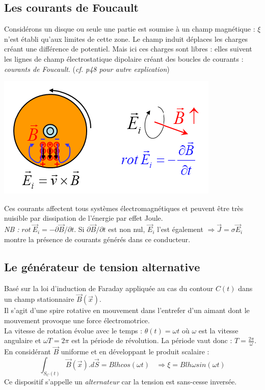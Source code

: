 \documentclass	[11pt, a4paper, openany]{book}
\begin{document}
\subsection{Les courants de Foucault}
Considérons un disque ou seule une partie est soumise à un champ magnétique : $\xi$ n'est établi qu'aux limites de cette zone. Le champ induit déplaces les charges créant une différence de potentiel. Mais ici ces charges sont libres : elles suivent les lignes de champ électrostatique dipolaire créant des boucles de courants : \textit{courants de Foucault}. (\textit{cf. p48 pour autre explication})
\begin{center}
	\includegraphics[scale=0.45]{em/image19.png}\\
\end{center}
Ces courants affectent tous systèmes électromagnétiques et peuvent être très nuisible par dissipation de l'énergie par effet Joule. \\
\textit{NB :} $rot\ \vec{E}_i = -\partial\vec{B}/\partial t$. Si $\partial\vec{B}/\partial t$ est non nul, $\vec{E}_i$ l'est également $\Rightarrow \vec{J} = \sigma\vec{E}_i$ montre la présence de courants générés dans ce conducteur.

\subsection{Le générateur de tension alternative}
Basé sur la loi d'induction de Faraday appliquée au cas du contour $C(t)$ dans un champ stationnaire $\vec{B}(\vec{x})$.\\
Il s'agit d'une spire rotative en mouvement dans l'entrefer d'un aimant dont le mouvement provoque une force électromotrice.\\
La vitesse de rotation évolue avec le temps : $\theta (t) = \omega t$ où $\omega$ est la vitesse angulaire et $\omega T = 2\pi$ est la période de révolution. La période vaut donc : $T = \frac{2\pi}{\omega}$. En considérant $\vec{B}$ uniforme et en développant le produit scalaire : 
\begin{equation}
	\int_{S_C(t)} \vec{B}(\vec{x}).d\vec{S} = Blhcos(\omega t)\ \ \ \ \Rightarrow \xi = Blh\omega sin(\omega t)
\end{equation}
Ce dispositif s'appelle un \textit{alternateur} car la tension est sans-cesse inversée.
\end{document}
